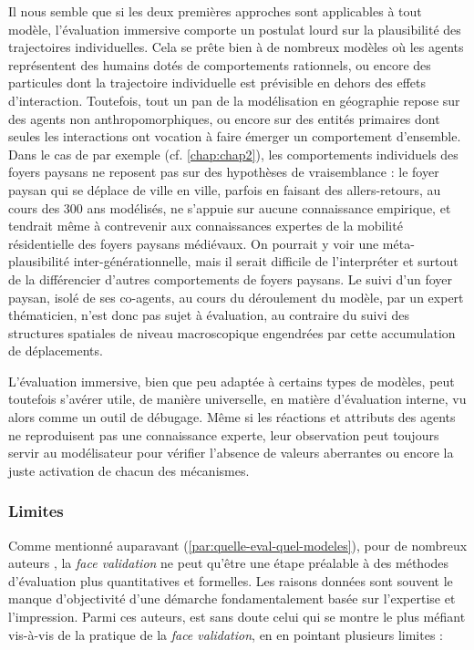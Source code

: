 Il nous semble que si les deux premières approches sont applicables à tout modèle, l'évaluation immersive comporte un postulat lourd sur la plausibilité des trajectoires individuelles.
Cela se prête bien à de nombreux modèles où les agents représentent des humains dotés de comportements rationnels, ou encore des particules dont la trajectoire individuelle est prévisible en dehors des effets d'interaction.
Toutefois, tout un pan de la modélisation en géographie repose sur des agents non anthropomorphiques, ou encore sur des entités primaires dont seules les interactions ont vocation à faire émerger un comportement d'ensemble.
Dans le cas de \simfeodal{} par exemple (cf. \cref{chap:chap2}), les comportements individuels des foyers paysans ne reposent pas sur des hypothèses de vraisemblance :
	le foyer paysan qui se déplace de ville en ville, parfois en faisant des allers-retours, au cours des 300 ans modélisés, ne s'appuie sur aucune connaissance empirique, et tendrait même à contrevenir aux connaissances expertes de la mobilité résidentielle des foyers paysans médiévaux.
On pourrait y voir une \og méta-plausibilité\fg{} inter-générationnelle, mais il serait difficile de l'interpréter et surtout de la différencier d'autres comportements de foyers paysans.
Le suivi d'un foyer paysan, isolé de ses co-agents, au cours du déroulement du modèle, par un expert thématicien, n'est donc pas sujet à évaluation, au contraire du suivi des structures spatiales de niveau macroscopique engendrées par cette accumulation de déplacements.

L'évaluation immersive, bien que peu adaptée à certains types de modèles, peut toutefois s'avérer utile, de manière universelle, en matière d'évaluation interne, vu alors comme un outil de \og débugage\fg{}.
Même si les réactions et attributs des agents ne reproduisent pas une connaissance experte, leur observation peut toujours servir au modélisateur pour vérifier l'absence de valeurs aberrantes ou encore la juste activation de chacun des mécanismes.



\subsubsection{Limites \label{subsubsec:limites-face-validation}}

Comme mentionné auparavant (\ref{par:quelle-eval-quel-modeles}), pour de nombreux auteurs \autocite{hermann_validation_1967, balci_validation_1994, kennedy_verification_2006}, la \textit{face validation} ne peut qu'être une étape préalable à des méthodes d'évaluation plus quantitatives et formelles.
Les raisons données sont souvent le manque d'objectivité d'une démarche fondamentalement basée sur l'expertise et l'impression.
Parmi ces auteurs, \citeauthor{hermann_validation_1967} est sans doute celui qui se montre le plus méfiant vis-à-vis de la pratique de la \textit{face validation}, en en pointant plusieurs limites :

